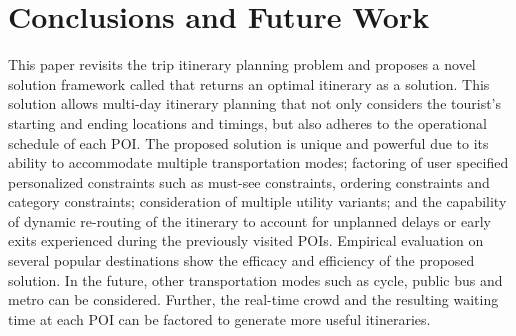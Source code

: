 \section{Conclusions and Future Work}

This paper revisits the trip itinerary planning problem and proposes a novel solution framework called \trip that returns an optimal itinerary as a solution. This solution allows multi-day itinerary planning that not only considers the tourist's starting and ending locations and timings, but also adheres to the operational schedule of each POI. The proposed solution is unique and powerful due to its ability to accommodate multiple transportation modes; factoring of user specified personalized constraints such as must-see constraints, ordering constraints and category constraints; consideration of multiple utility variants; and the capability of dynamic re-routing of the itinerary to account for unplanned delays or early exits experienced during the previously visited POIs. Empirical evaluation on several popular destinations show the   efficacy and efficiency of the proposed solution. In the future, other transportation modes such as cycle, public bus and metro can be considered. Further, the real-time crowd and the resulting waiting time at each POI can be factored to generate more useful itineraries.
